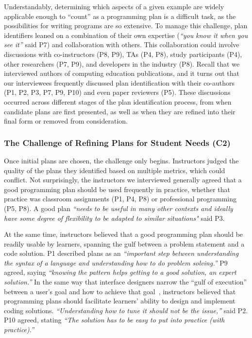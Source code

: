 Understandably, determining which aspects of a given example are widely applicable enough to ``count'' as a programming plan is a difficult task, as the possibilities for writing programs are so extensive. To manage this challenge, plan identifiers leaned on a combination of their own expertise (\textit{``you know it when you see it''} said P7) and collaboration with others.
This collaboration could involve discussions with co-instructors (P8, P9), TAs (P4, P8), study participants (P4), other researchers (P7, P9), and developers in the industry (P8). Recall that we interviewed authors of computing education publications, and it turns out that our interviewees frequently discussed plan identification with their co-authors (P1, P2, P3, P7, P9, P10) and even paper reviewers (P5).
These discussions occurred across different stages of the plan identification process, from when candidate plans are first presented, as well as when they are refined into their final form or removed from consideration. 

\subsubsection{The Challenge of Refining Plans for Student Needs (C2)} 
\label{sec:challenges_abstraction}
Once initial plans are chosen, the challenge only begins. Instructors judged the quality of the plans they identified based on multiple metrics, which could conflict. 
Not surprisingly, the instructors we interviewed generally agreed that a good programming plan should be used frequently in practice, whether that practice was classroom assignments (P1, P4, P8) or professional programming (P5, P8). A good plan \textit{``needs to be useful in many other contexts and ideally have some degree of flexibility to be adapted to similar situations"} said P3. 

At the same time, instructors believed that a good programming plan should be readily usable by learners, spanning the gulf between a problem statement and a code solution. P1 described plans as an \textit{``important step between understanding the syntax of a language and understanding how to do problem solving.''} P9 agreed, saying \textit{``knowing the pattern helps getting to a good solution, an expert solution.''} In the same way that interface designers narrow the ``gulf of execution'' between a user's goal and how to achieve that goal~\cite{Norman_UserCenteredSystemDesign_1986}, instructors believed that programming plans should facilitate learners' ability to design and implement coding solutions. \textit{``Understanding how to tune it should not be the issue,''} said P2. P10 agreed, stating \textit{``The solution has to be easy to put into practice (with practice).''}
 
